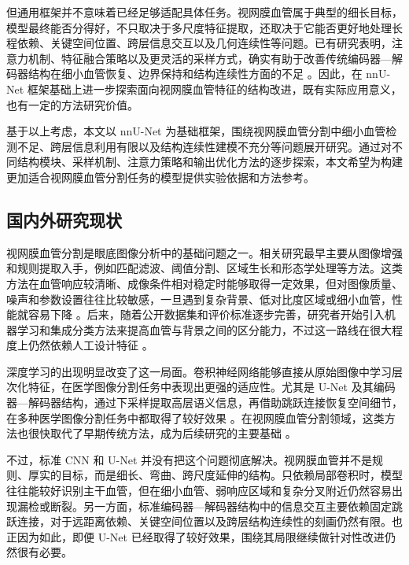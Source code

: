\documentclass[a4paper,12pt]{article}
\begin{document}
但通用框架并不意味着已经足够适配具体任务。视网膜血管属于典型的细长目标，模型最终能否分得好，不只取决于多尺度特征提取，还取决于它能否更好地处理长程依赖、关键空间位置、跨层信息交互以及几何连续性等问题。已有研究表明，注意力机制、特征融合策略以及更灵活的采样方式，确实有助于改善传统编码器—解码器结构在细小血管恢复、边界保持和结构连续性方面的不足 \cite{luo2025panet,oktay2018attentionunet,zhu2021deformabledetr,hou2021coordatt}。因此，在 nnU-Net 框架基础上进一步探索面向视网膜血管特征的结构改进，既有实际应用意义，也有一定的方法研究价值。

基于以上考虑，本文以 nnU-Net 为基础框架，围绕视网膜血管分割中细小血管检测不足、跨层信息利用有限以及结构连续性建模不充分等问题展开研究。通过对不同结构模块、采样机制、注意力策略和输出优化方法的逐步探索，本文希望为构建更加适合视网膜血管分割任务的模型提供实验依据和方法参考。

\subsection{国内外研究现状}
视网膜血管分割是眼底图像分析中的基础问题之一。相关研究最早主要从图像增强和规则提取入手，例如匹配滤波、阈值分割、区域生长和形态学处理等方法。这类方法在血管响应较清晰、成像条件相对稳定时能够取得一定效果，但对图像质量、噪声和参数设置往往比较敏感，一旦遇到复杂背景、低对比度区域或细小血管，性能就容易下降 \cite{hoover2000locating,staal2004drive}。后来，随着公开数据集和评价标准逐步完善，研究者开始引入机器学习和集成分类方法来提高血管与背景之间的区分能力，不过这一路线在很大程度上仍然依赖人工设计特征 \cite{fraz2012ensemble,budai2013robust}。

深度学习的出现明显改变了这一局面。卷积神经网络能够直接从原始图像中学习层次化特征，在医学图像分割任务中表现出更强的适应性。尤其是 U-Net 及其编码器—解码器结构，通过下采样提取高层语义信息，再借助跳跃连接恢复空间细节，在多种医学图像分割任务中都取得了较好效果 \cite{ronneberger2015unet,cicek2016unet3d,milletari2016vnet}。在视网膜血管分割领域，这类方法也很快取代了早期传统方法，成为后续研究的主要基础 \cite{liskowski2016segmenting,maninis2016driu,oliveira2018fcn}。

不过，标准 CNN 和 U-Net 并没有把这个问题彻底解决。视网膜血管并不是规则、厚实的目标，而是细长、弯曲、跨尺度延伸的结构。只依赖局部卷积时，模型往往能较好识别主干血管，但在细小血管、弱响应区域和复杂分叉附近仍然容易出现漏检或断裂。另一方面，标准编码器—解码器结构中的信息交互主要依赖固定跳跃连接，对于远距离依赖、关键空间位置以及跨层结构连续性的刻画仍然有限。也正因为如此，即便 U-Net 已经取得了较好效果，围绕其局限继续做针对性改进仍然很有必要。
\end{document}
